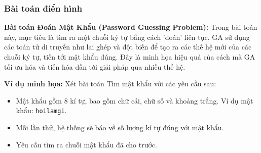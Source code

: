 \documentclass[14pt]{article}
\begin{document}
	\subsubsection{Bài toán điển hình}
	\textbf{Bài toán Đoán Mật Khẩu (Password Guessing Problem):} Trong bài toán này, mục tiêu là tìm ra một chuỗi ký tự bằng cách 'đoán' liên tục. GA sử dụng các toán tử di truyền như lai ghép và đột biến để tạo ra các thế hệ mới của các chuỗi ký tự, tiến tới mật khẩu đúng. Đây là minh họa hiệu quả của cách mà GA tối ưu hóa và tiến hóa dần tới giải pháp qua nhiều thế hệ.
	
	\begin{flushleft}
		\textbf{Ví dụ minh họa: }
		Xét bài toán Tìm mật khẩu với các yêu cầu sau:
		\begin{itemize}
			\item Mật khẩu gồm 8 kí tự, bao gồm chữ cái, chữ số và khoảng trắng. Ví dụ mật khẩu: \texttt{hoilamgi}.
			\item Mỗi lần thử, hệ thống sẽ báo về số lượng kí tự đúng với mật khẩu.
			\item Yêu cầu tìm ra chuỗi mật khẩu đã cho trước.
		\end{itemize}
	\end{flushleft}
\end{document}
